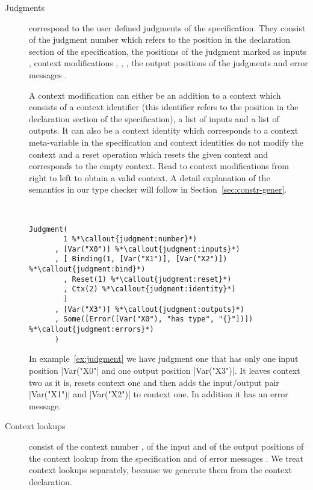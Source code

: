 \begin{description}
\item[Judgments] correspond to the user defined judgments of the
  specification. They consist of the judgment number
   which refers to the position in the
  declaration section of the specification, the positions of the
  judgment marked as inputs , context
  modifications ,
  , , the
  output positions of the judgments  and
  error messages .

  A context modification can either be an addition to a context
   which consists of a context identifier
  (this identifier refers to the position in the declaration section
  of the specification), a list of inputs and a list of outputs. It
  can also be a context identity  which
  corresponds to a context meta-variable in the specification and
  context identities do not modify the context and a reset operation
   which resets the given context and
  corresponds to the empty context. Read to context modifications from
  right to left to obtain a valid context. A detail explanation of the
  semantics in our type checker will follow in
  Section~\ref{sec:constr-gener}.

\begin{example}{~}
\begin{lstlisting}[language=sltc]
Judgment(
        1 %*\callout{judgment:number}*)
      , [Var("X0")] %*\callout{judgment:inputs}*)
      , [ Binding(1, [Var("X1")], [Var("X2")]) %*\callout{judgment:bind}*)
        , Reset(1) %*\callout{judgment:reset}*)
        , Ctx(2) %*\callout{judgment:identity}*)
        ]
      , [Var("X3")] %*\callout{judgment:outputs}*)
      , Some([Error([Var("X0"), "has type", "{}"])]) %*\callout{judgment:errors}*)
      )
\end{lstlisting}
\label{ex:judgment}
\end{example}

In example~\ref{ex:judgment} we have judgment one that has only one
input position \code|Var("X0"| and one output position
\code|Var("X3")|. It leaves context two as it is, resets context one
and then adds the input/output pair \code|Var("X1")| and
\code|Var("X2")| to context one. In addition it has an error message.

\item[Context lookups] consist of the context number
  , of the input  and
  of the output  positions of the context
  lookup from the specification and of error messages
  . We treat context lookups separately,
  because we generate them from the context declaration.


\end{description}
